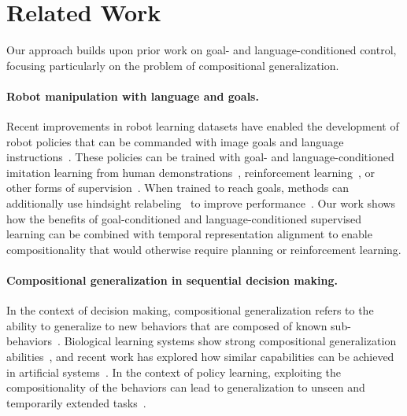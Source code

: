 \section{Related Work}
\label{sec:background}

Our approach builds upon prior work on goal- and language-conditioned control, focusing particularly on the problem of compositional generalization.

\paragraph{Robot manipulation with language and goals.}Recent improvements in robot learning datasets have enabled the development of robot policies that can be commanded with image goals and language instructions~\citep{ahn2022can,walke2023bridgedata,shridhar2021cliport}.
These policies can be trained with goal- and language-conditioned imitation learning from human demonstrations~\citep{chowdhery2023palm,jiang2023vima,lynch2021language,lynch2023interactive,brohan2023rt2}, reinforcement learning~\citep{chebotar2023qtransformer,chen2021decisiona}, or other forms of supervision~\citep{bobu2023sirl,cui2023no}.
When trained to reach goals, methods can additionally use hindsight relabeling~\citep{andrychowicz2017hindsight,kaelbling1993learning} to improve performance~\citep{walke2023bridgedata,myers2023goal,dehaene2022symbols,ding2019goal}.
Our work shows how the benefits of goal-conditioned and language-conditioned supervised learning can be combined with temporal representation alignment to enable compositionality that would otherwise require planning or reinforcement learning.

\paragraph{Compositional generalization in sequential decision making.}
In the context of decision making, compositional generalization refers to the ability to generalize to new behaviors that are composed of known sub-behaviors~\citep{rubino2023compositionality,steedman2004where}.
Biological learning systems show strong compositional generalization abilities~\citep{ciranka2022asymmetric,dehaene2022symbols,dickins2011transitive,lake2019human}, and recent work has explored how similar capabilities can be achieved in artificial systems~\citep{akyurek2021learning,ito2022compositional,lewis2024does}.
In the context of policy learning, exploiting the compositionality of the behaviors can lead to generalization to unseen and temporarily extended tasks~\citep{ghugare2023closing,kumar2023pre, fang2019cavin, fang2022generalization, mandlekar2021learning, nasiriany2019planning}.

